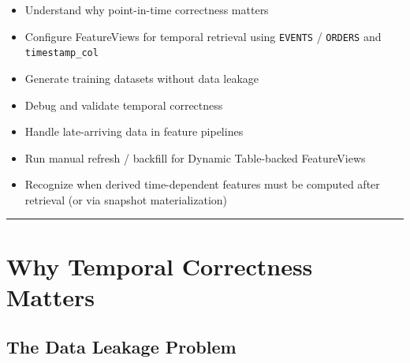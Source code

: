 \documentclass[
  letterpaper,
  DIV=11,
  numbers=noendperiod]{scrreprt}
\providecommand{\tightlist}{%
  \setlength{\itemsep}{0pt}\setlength{\parskip}{0pt}}\usepackage{longtable,booktabs,array}
\begin{document}
\begin{itemize}
\tightlist
\item
  Understand why point-in-time correctness matters
\item
  Configure FeatureViews for temporal retrieval using \texttt{EVENTS} /
  \texttt{ORDERS} and \texttt{timestamp\_col}
\item
  Generate training datasets without data leakage
\item
  Debug and validate temporal correctness
\item
  Handle late-arriving data in feature pipelines
\item
  Run manual refresh / backfill for Dynamic Table-backed FeatureViews
\item
  Recognize when derived time-dependent features must be computed after
  retrieval (or via snapshot materialization)
\end{itemize}

\begin{center}\rule{0.5\linewidth}{0.5pt}\end{center}

\hypertarget{why-temporal-correctness-matters}{%
\section{Why Temporal Correctness
Matters}\label{why-temporal-correctness-matters}}

\hypertarget{the-data-leakage-problem}{%
\subsection{The Data Leakage Problem}\label{the-data-leakage-problem}}
\end{document}
